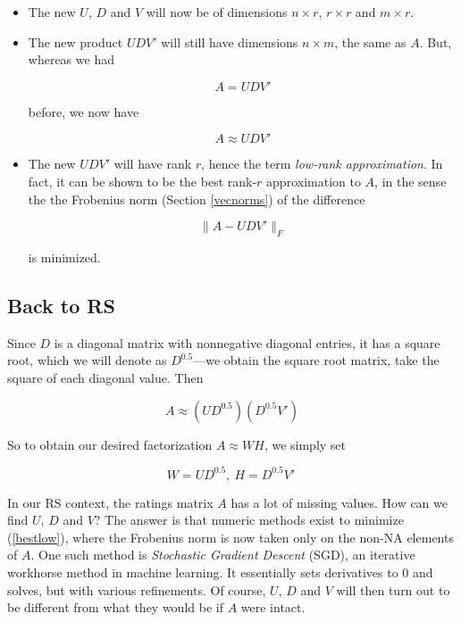\begin{itemize}

\item The new $U$, $D$ and $V$ will now be of dimensions
$n \times r$, $r \times r$ and $m \times r$.

\item The new product $UDV'$ will still have dimensions $n \times m$,
the same as $A$.  But, whereas we had

\begin{equation}
A = UDV'
\end{equation}

before, we now have

\begin{equation}
A \approx UDV'
\end{equation}

\item The new $UDV'$ will have rank $r$, hence the term
\textit{low-rank approximation}.  In fact, it can be shown to be the
best rank-$r$ approximation to $A$, in the sense the the Frobenius norm
(Section \ref{vecnorms}) of the difference 

\begin{equation}
\label{bestlow}
\| A - UDV'\|_{F}
\end{equation}

is minimized.

\end{itemize} 

\subsection{Back to RS}

Since $D$ is a diagonal matrix with nonnegative diagonal entries, it has
a square root, which we will denote as $D^{0.5}$---we obtain the square
root matrix, take the square of each diagonal value.  Then

\begin{equation}
A \approx (UD^{0.5}) (D^{0.5} V')
\end{equation}

So to obtain our desired factorization $A \approx WH$, we simply set

\begin{equation}
W = UD^{0.5}, ~ H = D^{0.5}V' ~ 
\end{equation}

In our RS context, the ratings matrix $A$ has a lot of missing values.
How can we find $U$, $D$ and $V$?  The answer is that numeric methods
exist to minimize (\ref{bestlow}), where the Frobenius norm is now taken
only on the non-NA elements of $A$.  One such method is
\textit{Stochastic Gradient Descent} (SGD), an iterative workhorse
method in machine learning.  It essentially sets derivatives to 0 and
solves, but with various refinements.  Of course, $U$, $D$ and $V$ will
then turn out to be different from what they would be if $A$ were
intact.

